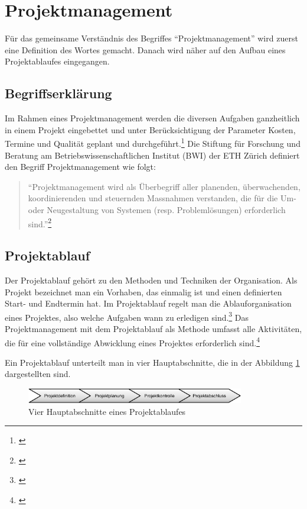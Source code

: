 \section{Projektmanagement}
Für das gemeinsame Verständnis des Begriffes ``Projektmanagement'' wird zuerst
eine Definition des Wortes gemacht. Danach wird näher auf den Aufbau eines
Projektablaufes eingegangen.

\subsection{Begriffserklärung}
Im Rahmen eines Projektmanagement werden die diversen Aufgaben ganzheitlich in
einem Projekt eingebettet und unter Berücksichtigung der Parameter Kosten, Termine
und Qualität geplant und durchgeführt.\footnote{\citealp*[Vgl.][S. 9]{burghardt2007einfuehrung}}
Die Stiftung für Forschung und Beratung am Betriebswissenschaftlichen Institut 
(BWI) der ETH Zürich definiert den Begriff Projektmanagement wie folgt:

\begin{quote}
``Projektmanagement wird als Überbegriff aller planenden, überwachenden,
koordinierenden und steuernden Massnahmen verstanden, die für die Um- oder
Neugestaltung von Systemen (resp. Problemlösungen) erforderlich sind.''\footnote{\citealp*[S. 1.1]{stiftung1998projekt}}
\end{quote}

\subsection{Projektablauf}
Der Projektablauf gehört zu den Methoden und Techniken der Organisation. Als
Projekt bezeichnet man ein Vorhaben, das einmalig ist und einen definierten
Start- und Endtermin hat. Im Projektablauf regelt man die Ablauforganisation
eines Projektes, also welche Aufgaben wann zu erledigen sind.\footnote{\citealp*[Vgl.][S. 136]{schmidt2002einfuehrung}}
Das Projektmanagement mit dem Projektablauf als Methode umfasst alle Aktivitäten,
die für eine vollständige Abwicklung eines Projektes erforderlich sind.\footnote{\citealp*[Vgl.][S. 11]{burghardt2007einfuehrung}}

Ein Projektablauf unterteilt man in vier Hauptabschnitte, die in der Abbildung \ref{pic:01_hauptabschnitte}
dargestellten sind.

\begin{figure}[htbp]
\begin{center}
\includegraphics[width=0.85\textwidth,angle=0]{./bilder/theorie/01_hauptabschnitte.pdf}
\caption{Vier Hauptabschnitte eines Projektablaufes}
\label{pic:01_hauptabschnitte}
\end{center}
\end{figure}

